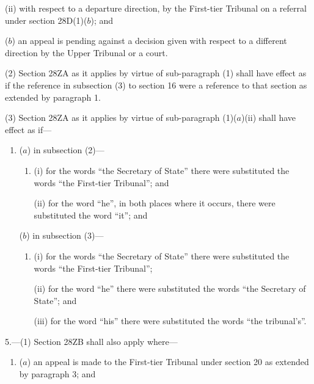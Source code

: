 \documentclass[a4paper]{article}
\begin{document}
{\begin{enumerate}
\begin{enumerate}
(ii) with respect to a departure direction, by the First-tier Tribunal on a referral under section 28D(1)($b$); and
\end{enumerate}

($b$) an appeal is pending against a decision given with respect to a different direction by the Upper Tribunal or a court.
\end{enumerate}

(2) Section 28ZA as it applies by virtue of sub-paragraph (1) shall have effect as if the reference in subsection (3) to section 16 were a reference to that section as extended by paragraph 1.

(3) Section 28ZA as it applies by virtue of sub-paragraph (1)($a$)(ii) shall have effect as if---
\begin{enumerate}\item[]
($a$) in subsection (2)---
\begin{enumerate}\item[]
(i) for the words “the Secretary of State” there were substituted the words “the First-tier Tribunal”; and

(ii) for the word “he”, in both places where it occurs, there were substituted the word “it”; and
\end{enumerate}

($b$) in subsection (3)---
\begin{enumerate}\item[]
(i) for the words “the Secretary of State” there were substituted the words “the First-tier Tribunal”;

(ii) for the word “he” there were substituted the words “the Secretary of State”; and

(iii) for the word “his” there were substituted the words “the tribunal's”.
\end{enumerate}
\end{enumerate}


\medskip

5.---(1) Section 28ZB shall also apply where---
\begin{enumerate}\item[]
($a$) an appeal is made to the First-tier Tribunal under section 20 as extended by paragraph 3; and


\end{enumerate}}
\end{document}
